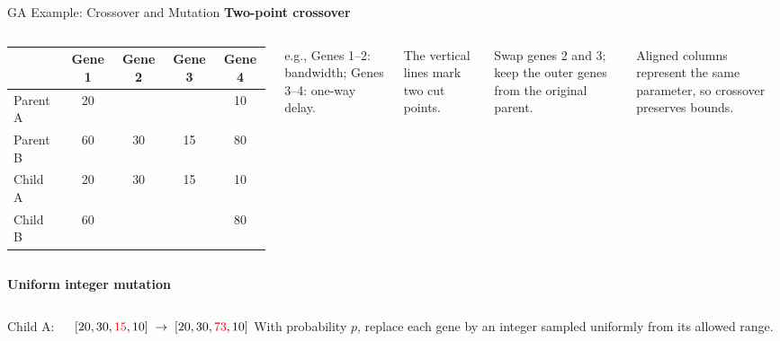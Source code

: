 \source{}
\begin{frame}[t]{GA Example: Crossover and Mutation}
\bodyfont
{\color{SemBlue}\textbf{Two-point crossover}}\par
\vspace{12pt}
\begin{columns}[c,onlytextwidth]
\column{445pt}
{\compactfont\renewcommand{\arraystretch}{1.15}\setlength{\tabcolsep}{10pt}
\begin{tabular}{@{}l c|cc|c@{}}
\toprule
& Gene 1 & Gene 2 & Gene 3 & Gene 4\\\midrule
Parent A & 20 & \cellcolor{blue!70!black}\textcolor{white}{5} & \cellcolor{blue!70!black}\textcolor{white}{40} & 10\\
Parent B & 60 & \cellcolor{orange!65}30 & \cellcolor{orange!65}15 & 80\\\midrule
Child A & 20 & \cellcolor{orange!65}30 & \cellcolor{orange!65}15 & 10\\
Child B & 60 & \cellcolor{blue!70!black}\textcolor{white}{5} & \cellcolor{blue!70!black}\textcolor{white}{40} & 80\\\bottomrule
\end{tabular}\par}
\vspace{10pt}
{\fontsize{18}{22}\selectfont\color{SemGray}e.g., Genes 1--2: bandwidth; Genes 3--4: one-way delay.\par}
\column{420pt}\compactfont
The vertical lines mark two cut points.\par
\vspace{12pt}
Swap genes 2 and 3; keep the outer genes from the original parent.\par
\vspace{12pt}
Aligned columns represent the same parameter, so crossover preserves bounds.
\end{columns}
\pause
\vspace{14pt}
{\color{SemBlue}\textbf{Uniform integer mutation}}\par
\vspace{12pt}
\begin{columns}[T,onlytextwidth]
\column{445pt}\compactfont
Child A:\par
\vspace{10pt}
$[20,30,\textcolor{red}{15},10]\;\to\;[20,30,\textcolor{red}{73},10]$
\column{420pt}
With probability $p$, replace each gene by an integer sampled uniformly from its allowed range.\par
\end{columns}
\end{frame}

